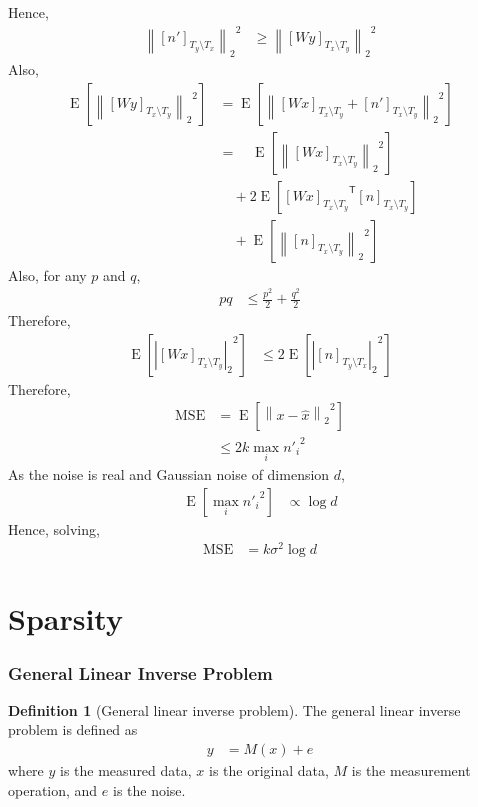 \documentclass[titlepage, fleqn, a4paper, 12pt, twoside]{article}
\theoremstyle{definition}
\newtheorem{definition}{Definition}
\theoremstyle{theorem}
\DeclareMathOperator{\expct}{\mathrm{E}}
\def\transpose#1{{#1}^{\mathsf{T}}}
\begin{document}
Hence,
\begin{align*}
	{\left\| [n']_{T_y \setminus T_x} \right\|_2}^2 &\ge {\left\| [W y]_{T_x \setminus T_y} \right\|_2}^2
\end{align*}
Also,
\begin{align*}
	\expct\left[ {\left\| [W y]_{T_x \setminus T_y} \right\|_2}^2 \right] &= \expct\left[ {\left\| [W x]_{T_x \setminus T_y} + [n']_{T_x \setminus T_y} \right\|_2}^2 \right]\\
	&=\quad \expct\left[ {\left\| [W x]_{T_x \setminus T_y} \right\|_2}^2 \right]\\
	&\quad + 2 \expct\left[ \transpose{[W x]_{T_x \setminus T_y}} [n]_{T_x \setminus T_y} \right]\\
	&\quad + \expct\left[ {\left\| [n]_{T_x \setminus T_y} \right\|_2}^2 \right]
\end{align*}
Also, for any $p$ and $q$,
\begin{align*}
	p q &\le \frac{p^2}{2} + \frac{q^2}{2}
\end{align*}
Therefore,
\begin{align*}
	\expct\left[ {\left| [W x]_{T_x \setminus T_y} \right|_2}^2 \right] &\le 2 \expct\left[ {\left| [n]_{T_y \setminus T_x} \right|_2}^2 \right]
\end{align*}
Therefore,
\begin{align*}
	\text{MSE} &= \expct\left[ {\left\| x - \hat{x} \right\|_2}^2 \right]\\
	&\le 2 k \max\limits_{i} {{n'}_i}^2
\end{align*}
As the noise is real and Gaussian noise of dimension $d$,
\begin{align*}
	\expct\left[ \max\limits_{i} {{n'}_i}^2 \right] &\propto \log d
\end{align*}
Hence, solving,
\begin{align*}
	\text{MSE} &= k \sigma^2 \log d
\end{align*}

\clearpage
\part{Sparsity}

\section{General Linear Inverse Problem}

\begin{definition}[General linear inverse problem]
	The general linear inverse problem is defined as
	\begin{align*}
		y &= M(x) + e
	\end{align*}
	where $y$ is the measured data, $x$ is the original data, $M$ is the measurement operation, and $e$ is the noise.
\end{definition}
\end{document}
